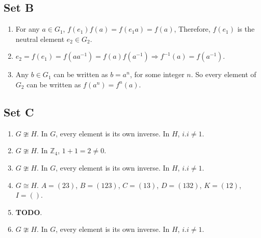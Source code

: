 \subsection{Set B}
\begin{enumerate}
    \item For any $ a \in G_1 $, $ f(e_1)f(a) = f(e_1a) = f(a) $, Therefore, $ f(e_1) $ is the neutral element $ e_2 \in G_2 $.
    
    \item $ e_2 = f(e_1) = f(aa^{-1}) =f(a)f(a^{-1}) \Rightarrow f^{-1}(a) = f(a^{-1}) $.
    
    \item Any $ b \in G_1 $ can be written as $ b = a^n $, for some integer $n$. So every element of $ G_2 $ can be written as $ f(a^n) = f^n(a) $.
\end{enumerate}

\subsection{Set C}
\begin{enumerate}
    \item $ G \ncong H $. In $ G $, every element is its own inverse. In $ H $, $ i.i \ne 1 $.
    
    \item $ G \ncong H $. In $ \mathbb{Z}_4 $, $ 1 + 1 = 2 \ne 0 $.
    
    \item $ G \ncong H $. In $ G $, every element is its own inverse. In $ H $, $ i.i \ne 1 $.
    
    \item $ G \cong H $. $ A = (23) $, $ B = (123) $, $ C = (13) $, $ D = (132) $, $ K = (12) $, $ I = () $.
    
    \item \textbf{TODO}.
    
    \item $ G \ncong H $. In $ G $, every element is its own inverse. In $ H $, $ i.i \ne 1 $.
\end{enumerate}

